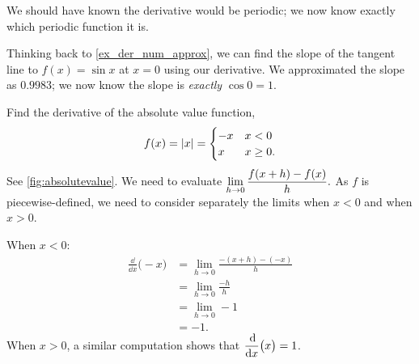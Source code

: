 We should have known the derivative would be periodic; we now know exactly which periodic function it is.

Thinking back to \autoref{ex_der_num_approx}, we can find the slope of the tangent line to $f(x)=\sin x$ at $x=0$ using our derivative. We approximated the slope as $0.9983$; we now know the slope is \emph{exactly} $\cos 0 =1$.

\begin{example}\label{ex_not_diff}%
Find the derivative of the absolute value function,
\[f(x) = \left\lvert x \right\rvert = \begin{cases}-x & x<0 \\ x & x\geq 0.\end{cases}\]\vspace{-.5\baselineskip}
See \autoref{fig:absolutevalue}.
\solution
We need to evaluate $\displaystyle \lim_{h\to0}\frac{f(x+h)-f(x)}{h}.$ As $f$ is piecewise-defined, we need to consider separately the limits when $x<0$ and when $x>0$.


When $x<0$:
	\begin{align*}
	\frac{\dd}{\dd x}\bigl(-x\bigr)
	&= \lim_{h\to 0}\frac{-(x+h) - (-x)}{h} \\
	&=	\lim_{h\to 0}\frac{-h}{h}\\
	&=	\lim_{h\to 0}-1 \\
	&=	-1.
	\end{align*}
When $x>0$, a similar computation shows that $\displaystyle \frac{\operatorname{d}\!}{\operatorname{d}\! x}\bigl(x\bigr) = 1$.


\end{example}
